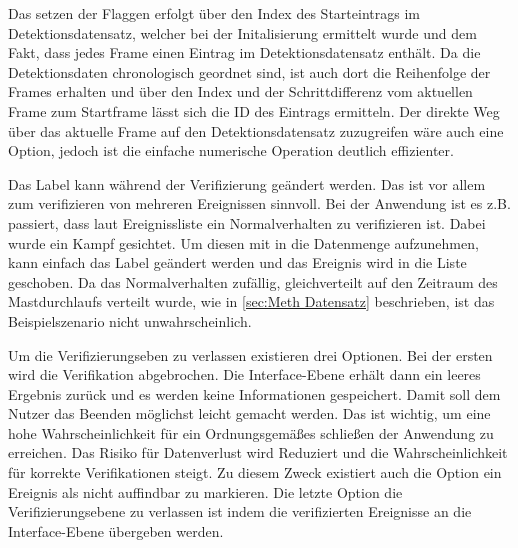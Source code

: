 Das setzen der Flaggen erfolgt über den Index des Starteintrags im Detektionsdatensatz, welcher bei der Initalisierung ermittelt wurde und dem Fakt, dass jedes Frame einen Eintrag im Detektionsdatensatz enthält. Da die Detektionsdaten chronologisch geordnet sind, ist auch dort die Reihenfolge der Frames erhalten und über den Index und der Schrittdifferenz vom aktuellen Frame zum Startframe lässt sich die ID des Eintrags ermitteln. Der direkte Weg über das aktuelle Frame auf den Detektionsdatensatz zuzugreifen wäre auch eine Option, jedoch ist die einfache numerische Operation deutlich effizienter. \par

Das Label kann während der Verifizierung geändert werden. Das ist vor allem zum verifizieren von mehreren Ereignissen sinnvoll. Bei der Anwendung ist es z.B. passiert, dass laut Ereignissliste ein Normalverhalten zu verifizieren ist. Dabei wurde ein Kampf gesichtet. Um diesen mit in die Datenmenge aufzunehmen, kann einfach das Label geändert werden und das Ereignis wird in die Liste geschoben. Da das Normalverhalten zufällig, gleichverteilt auf den Zeitraum des Mastdurchlaufs verteilt wurde, wie in \ref{sec:Meth Datensatz} beschrieben, ist das Beispielszenario nicht unwahrscheinlich. \par

Um die Verifizierungseben zu verlassen existieren drei Optionen. Bei der ersten wird die Verifikation abgebrochen. Die Interface-Ebene erhält dann ein leeres Ergebnis zurück und es werden keine Informationen gespeichert. Damit soll dem Nutzer das Beenden möglichst leicht gemacht werden. Das ist wichtig, um eine hohe Wahrscheinlichkeit für ein Ordnungsgemäßes schließen der Anwendung zu erreichen. Das Risiko für  Datenverlust wird Reduziert und die Wahrscheinlichkeit für korrekte Verifikationen steigt. Zu diesem Zweck existiert auch die Option ein Ereignis als nicht auffindbar zu markieren. Die letzte Option die Verifizierungsebene zu verlassen ist indem die verifizierten Ereignisse an die Interface-Ebene übergeben werden. 

